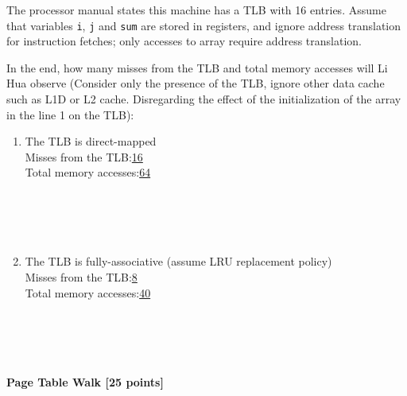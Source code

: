 \documentclass[addpoints, 12pt, answers]{exam}
\begin{document}
\begin{questions}
\begin{parts}
		The processor manual states this machine has a TLB with 16 entries. Assume that variables \texttt{i}, \texttt{j} and \texttt{sum} are stored in registers, and ignore address translation for instruction fetches; only accesses to array require address translation.

		In the end, how many misses from the TLB and total memory accesses will Li Hua observe (Consider only the presence of the TLB, ignore other data cache such as L1D or L2 cache. Disregarding the effect of the initialization of the array in the line 1 on the TLB):


		\begin{enumerate}
			\item The TLB is direct-mapped \\

			      Misses from the TLB:\quad\underline{16}\\

			      Total memory accesses:\quad\underline{64}\\

			      \quad\\\quad\\\quad\\\quad\\\quad

			\item The TLB is fully-associative (assume LRU replacement policy) \\

			      Misses from the TLB:\quad\underline{8}\\

			      Total memory accesses:\quad\underline{40}\\

			      \quad\\\quad\\\quad\\\quad\\\quad

		\end{enumerate}

	\end{parts}

	\pagebreak

	\question[25] \textbf{Page Table Walk [25 points]}


\end{questions}
\end{document}
